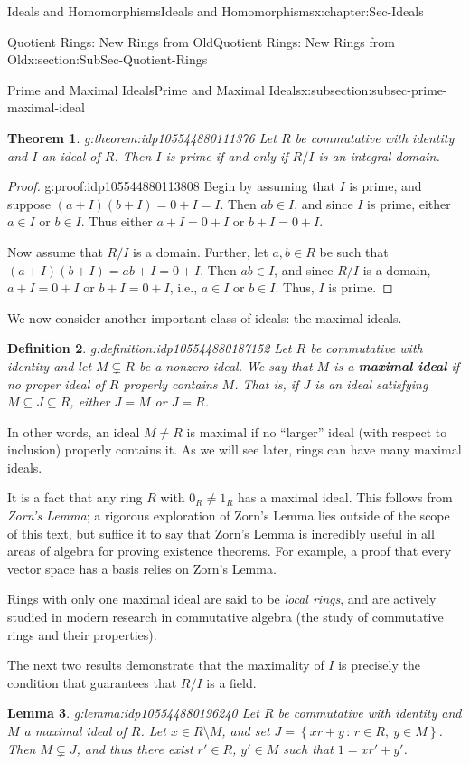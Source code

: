 \documentclass[oneside,10pt,]{book}
\newcommand{\terminology}[1]{\textbf{#1}}
\numberwithin{equation}{section}
\newcommand{\setof}[2]{{\left\{#1\,\colon\,#2\right\}}}
\newtheorem{theorem}{Theorem}[section]
\newtheorem{lemma}[theorem]{Lemma}
\newtheorem{definition}[theorem]{Definition}
\begin{document}
\begin{chapterptx}{Ideals and Homomorphisms}{}{Ideals and Homomorphisms}{}{}{x:chapter:Sec-Ideals}
\begin{sectionptx}{Quotient Rings: New Rings from Old}{}{Quotient Rings: New Rings from Old}{}{}{x:section:SubSec-Quotient-Rings}
\begin{subsectionptx}{Prime and Maximal Ideals}{}{Prime and Maximal Ideals}{}{}{x:subsection:subsec-prime-maximal-ideal}
\begin{theorem}{}{}{g:theorem:idp105544880111376}%
Let \(R\) be commutative with identity and \(I\) an ideal of \(R\). Then \(I\) is prime if and only if \(R/I\) is an integral domain.%
\end{theorem}
\begin{proof}{}{g:proof:idp105544880113808}
Begin by assuming that \(I\) is prime, and suppose \((a+I)(b+I) = 0+I = I\). Then \(ab \in I\), and since \(I\) is prime, either \(a\in I\) or \(b\in I\). Thus either \(a+I = 0+I\) or \(b+I = 0+I\).%
\par
Now assume that \(R/I\) is a domain. Further, let \(a,b\in R\) be such that \((a+I)(b+I) = ab+I = 0+I\). Then \(ab\in I\), and since \(R/I\) is a domain, \(a+I = 0+I\) or \(b+I = 0+I\), i.e., \(a\in I\) or \(b\in I\). Thus, \(I\) is prime.%
\end{proof}
We now consider another important class of ideals: the maximal ideals.%
\begin{definition}{}{g:definition:idp105544880187152}%
%
%
Let \(R\) be commutative with identity and let \(M\subsetneq R\) be a nonzero ideal. We say that \(M\) is a \terminology{maximal ideal} if no proper ideal of \(R\) properly contains \(M\). That is, if \(J\) is an ideal satisfying \(M\subseteq J\subseteq R\), either \(J=M\) or \(J=R\).%
\end{definition}
In other words, an ideal \(M\ne R\) is maximal if no ``larger'' ideal (with respect to inclusion) properly contains it. As we will see later, rings can have many maximal ideals.%
\par
It is a fact that any ring \(R\) with \(0_R\ne 1_R\) has a maximal ideal. This follows from \emph{Zorn's Lemma}; a rigorous exploration of Zorn's Lemma lies outside of the scope of this text, but suffice it to say that Zorn's Lemma is incredibly useful in all areas of algebra for proving existence theorems. For example, a proof that every vector space has a basis relies on Zorn's Lemma.%
\par
Rings with only one maximal ideal are said to be \emph{local rings}, and are actively studied in modern research in commutative algebra (the study of commutative rings and their properties).%
\par
The next two results demonstrate that the maximality of \(I\) is precisely the condition that guarantees that \(R/I\) is a field.%
\begin{lemma}{}{}{g:lemma:idp105544880196240}%
Let \(R\) be commutative with identity and \(M\) a maximal ideal of \(R\). Let \(x\in R\setminus M\), and set \(J = \setof{xr+y}{r\in R, \ y\in M}\). Then \(M\subsetneq J\), and thus there exist \(r'\in R\), \(y'\in M\) such that \(1 = xr'+y'\).%

\end{lemma}
\end{subsectionptx}
\end{sectionptx}
\end{chapterptx}
\end{document}
